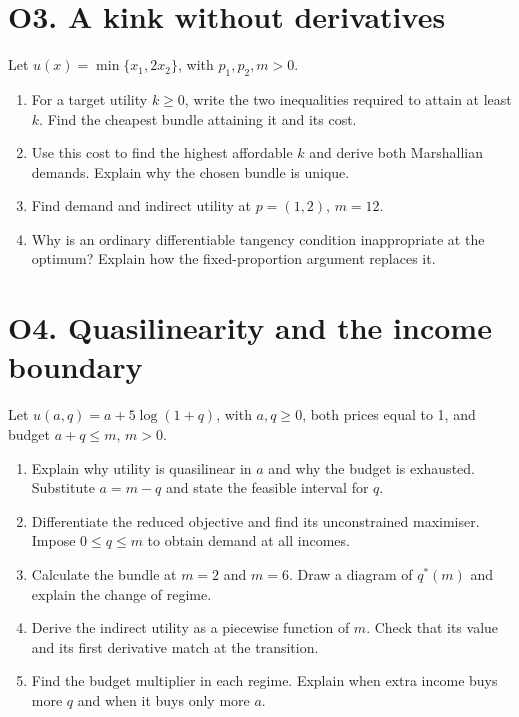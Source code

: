 \clearpage
\section*{O3. A kink without derivatives}
Let $u(x)=\min\{x_1,2x_2\}$, with $p_1,p_2,m>0$.
\begin{enumerate}[label=(\alph*)]
\item For a target utility $k\ge0$, write the two inequalities required to attain at least $k$. Find the cheapest bundle attaining it and its cost.
\item Use this cost to find the highest affordable $k$ and derive both Marshallian demands. Explain why the chosen bundle is unique.
\item Find demand and indirect utility at $p=(1,2)$, $m=12$.
\item Why is an ordinary differentiable tangency condition inappropriate at the optimum? Explain how the fixed-proportion argument replaces it.
\end{enumerate}
\section*{O4. Quasilinearity and the income boundary}
Let $u(a,q)=a+5\log(1+q)$, with $a,q\ge0$, both prices equal to 1, and budget $a+q\le m$, $m>0$.
\begin{enumerate}[label=(\alph*)]
\item Explain why utility is quasilinear in $a$ and why the budget is exhausted. Substitute $a=m-q$ and state the feasible interval for $q$.
\item Differentiate the reduced objective and find its unconstrained maximiser. Impose $0\le q\le m$ to obtain demand at all incomes.
\item Calculate the bundle at $m=2$ and $m=6$. Draw a diagram of $q^*(m)$ and explain the change of regime.
\item Derive the indirect utility as a piecewise function of $m$. Check that its value and its first derivative match at the transition.
\item Find the budget multiplier in each regime. Explain when extra income buys more $q$ and when it buys only more $a$.
\end{enumerate}

